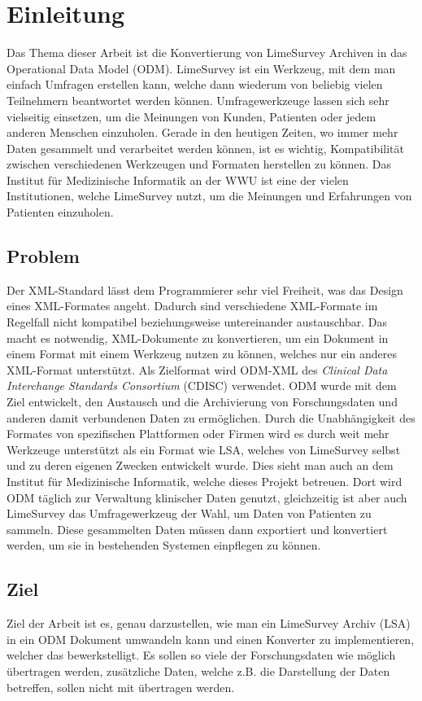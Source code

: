 \chapter{Einleitung}
\label{ch:einleitung}

Das Thema dieser Arbeit ist die Konvertierung von LimeSurvey Archiven in das Operational Data Model (ODM).
LimeSurvey ist ein Werkzeug, mit dem man einfach Umfragen erstellen kann, welche dann wiederum von beliebig vielen Teilnehmern beantwortet werden können.
Umfragewerkzeuge lassen sich sehr vielseitig einsetzen, um die Meinungen von Kunden, Patienten oder jedem anderen Menschen einzuholen.
Gerade in den heutigen Zeiten, wo immer mehr Daten gesammelt und verarbeitet werden können, ist es wichtig, Kompatibilität zwischen verschiedenen Werkzeugen und Formaten herstellen zu können.
Das Institut für Medizinische Informatik an der WWU ist eine der vielen Institutionen, welche LimeSurvey nutzt, um die Meinungen und Erfahrungen von Patienten einzuholen.

\section{Problem}
Der XML-Standard lässt dem Programmierer sehr viel Freiheit, was das Design eines XML-Formates angeht. Dadurch sind verschiedene XML-Formate im Regelfall nicht kompatibel beziehungsweise untereinander austauschbar.
Das macht es notwendig, XML-Dokumente zu konvertieren, um ein Dokument in einem Format mit einem Werkzeug nutzen zu können, welches nur ein anderes XML-Format unterstützt.
Als Zielformat wird ODM-XML des \textit{Clinical Data Interchange Standards Consortium} (CDISC) verwendet.
ODM wurde mit dem Ziel entwickelt, den Austausch und die Archivierung von Forschungsdaten und anderen damit verbundenen Daten zu ermöglichen.
Durch die Unabhängigkeit des Formates von spezifischen Plattformen oder Firmen wird es durch weit mehr Werkzeuge unterstützt als ein Format wie LSA, welches von LimeSurvey selbst und zu deren eigenen Zwecken entwickelt wurde.
Dies sieht man auch an dem Institut für Medizinische Informatik, welche dieses Projekt betreuen.
Dort wird ODM täglich zur Verwaltung klinischer Daten genutzt, gleichzeitig ist aber auch LimeSurvey das Umfragewerkzeug der Wahl, um Daten von Patienten zu sammeln.
Diese gesammelten Daten müssen dann exportiert und konvertiert werden, um sie in bestehenden Systemen einpflegen zu können.

\section{Ziel}
Ziel der Arbeit ist es, genau darzustellen, wie man ein LimeSurvey Archiv (LSA) in ein ODM Dokument umwandeln kann und einen Konverter zu implementieren, welcher das bewerkstelligt.
Es sollen so viele der Forschungsdaten wie möglich übertragen werden, zusätzliche Daten, welche z.B. die Darstellung der Daten betreffen, sollen nicht mit übertragen werden.


